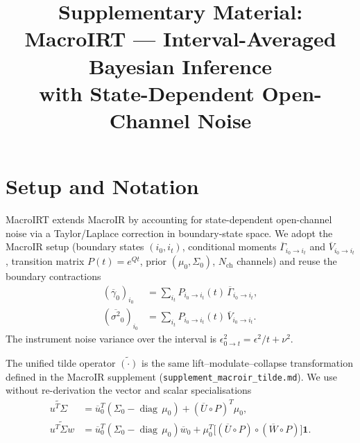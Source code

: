 \documentclass[11pt]{article}
\title{Supplementary Material:\\
MacroIRT --- Interval-Averaged Bayesian Inference\\
with State-Dependent Open-Channel Noise}
\author{}
\date{}
\begin{document}
\maketitle

\newcommand{\E}{\mathbb{E}}
\newcommand{\Var}{\operatorname{Var}}
\newcommand{\diag}{\operatorname{diag}}
\newcommand{\Nch}{N_{\mathrm{ch}}}
\newcommand{\gbar}{\overline{\gamma}_0}
\newcommand{\sbar}{\overline{\sigma^2}_0}
\newcommand{\tildeg}{\widetilde{\gamma^{T}\Sigma}}
\newcommand{\tildev}{\widetilde{v^{T}\Sigma}}
\newcommand{\tildegg}{\widetilde{\gamma^{T}\Sigma\gamma}}
\newcommand{\tildevv}{\widetilde{v^{T}\Sigma v}}

\section{Setup and Notation}

MacroIRT extends MacroIR by accounting for state-dependent open-channel
noise via a Taylor/Laplace correction in boundary-state space. We
adopt the MacroIR setup (boundary states $(i_0,i_t)$, conditional
moments $\overline{\Gamma}_{i_0\to i_t}$ and
$\overline{V}_{i_0\to i_t}$, transition matrix $P(t)=e^{Qt}$,
prior $(\mu_0,\Sigma_0)$, $\Nch$ channels) and reuse the boundary
contractions
\begin{align}
  (\gbar)_{i_0}
  &= \sum_{i_t} P_{i_0\to i_t}(t)\,\overline{\Gamma}_{i_0\to i_t},
  \label{eq:gbar}\\
  (\sbar)_{i_0}
  &= \sum_{i_t} P_{i_0\to i_t}(t)\,\overline{V}_{i_0\to i_t}.
  \label{eq:sbar}
\end{align}
The instrument noise variance over the interval is
$\epsilon^2_{0\to t}=\epsilon^2/t+\nu^2$.

The unified tilde operator $\widetilde{(\cdot)}$ is the same
lift--modulate--collapse transformation defined in the MacroIR
supplement (\texttt{supplement\_macroir\_tilde.md}). We use without
re-derivation the vector and scalar specialisations
\begin{align}
  \widetilde{u^{T}\Sigma}
  &= \overline{u}_0^{T}(\Sigma_0-\diag\,\mu_0)
   + (\overline{U}\circ P)^{T}\mu_0,\\
  \widetilde{u^{T}\Sigma w}
  &= \overline{u}_0^{T}(\Sigma_0-\diag\,\mu_0)\overline{w}_0
   + \mu_0^{T}\big[(\overline{U}\circ P)\circ(\overline{W}\circ P)\big]\mathbf{1}.
\end{align}
\end{document}
